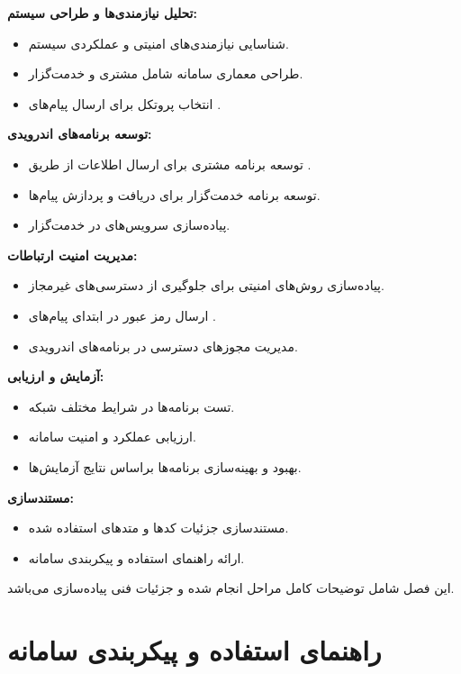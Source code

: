 \documentclass{report}
\begin{document}
\textbf{تحلیل نیازمندی‌ها و طراحی سیستم:}
\begin{itemize}
	\item شناسایی نیازمندی‌های امنیتی و عملکردی سیستم.
	\item طراحی معماری سامانه شامل مشتری و خدمت‌گزار.
	\item انتخاب پروتکل
	برای ارسال پیام‌های
	.
\end{itemize}
\textbf{توسعه برنامه‌های اندرویدی:}
\begin{itemize}
	\item 
	توسعه برنامه مشتری برای ارسال اطلاعات از طریق
	.
	\item 
	توسعه برنامه خدمت‌گزار برای دریافت و پردازش پیام‌ها.
	\item 
	پیاده‌سازی سرویس‌های
	در خدمت‌گزار.
\end{itemize}
\textbf{مدیریت امنیت ارتباطات:}
\begin{itemize}
	\item 
	پیاده‌سازی روش‌های امنیتی برای جلوگیری از دسترسی‌های غیرمجاز.
	\item
	ارسال رمز عبور در ابتدای پیام‌های
	.
	\item
	مدیریت مجوزهای دسترسی در برنامه‌های اندرویدی.
\end{itemize}
\textbf{آزمایش و ارزیابی:}
\begin{itemize}
	\item تست برنامه‌ها در شرایط مختلف شبکه.
	\item ارزیابی عملکرد و امنیت سامانه.
	\item بهبود و بهینه‌سازی برنامه‌ها براساس نتایج آزمایش‌ها.
\end{itemize}
\textbf{مستندسازی:}
\begin{itemize}
	\item مستندسازی جزئیات کدها و متدهای استفاده شده.
	\item ارائه راهنمای استفاده و پیکربندی سامانه.
\end{itemize}
این فصل شامل توضیحات کامل مراحل انجام شده و جزئیات فنی پیاده‌سازی می‌باشد.

\chapter{راهنمای استفاده و پیکربندی سامانه}
\end{document}
